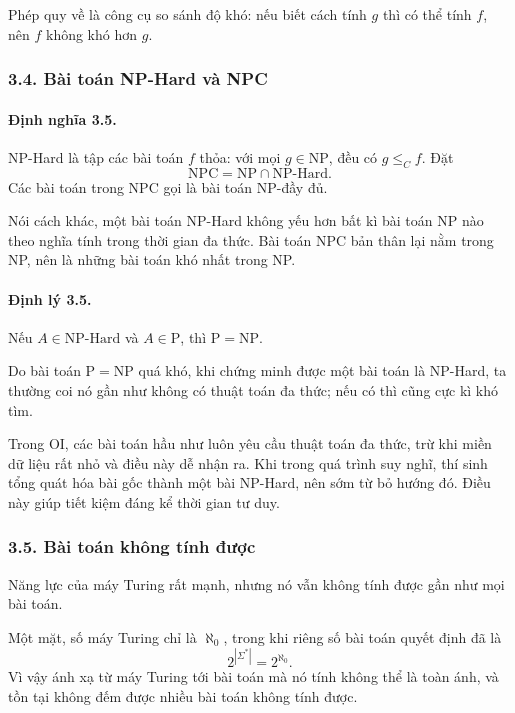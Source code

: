 \documentclass[11pt]{article}
\begin{document}
Phép quy về là công cụ so sánh độ khó: nếu biết cách tính \(g\) thì có thể tính
\(f\), nên \(f\) không khó hơn \(g\).

\subsubsection*{3.4. Bài toán NP-Hard và NPC}

\paragraph{Định nghĩa 3.5.}
NP-Hard là tập các bài toán \(f\) thỏa: với mọi \(g\in\mathrm{NP}\), đều có
\(g\le_C f\). Đặt
\[
  \mathrm{NPC}=\mathrm{NP}\cap\mathrm{NP\text{-}Hard}.
\]
Các bài toán trong NPC gọi là bài toán NP-đầy đủ.

Nói cách khác, một bài toán NP-Hard không yếu hơn bất kì bài toán NP nào theo
nghĩa tính trong thời gian đa thức. Bài toán NPC bản thân lại nằm trong NP, nên
là những bài toán khó nhất trong NP.

\paragraph{Định lý 3.5.}
Nếu \(A\in\mathrm{NP\text{-}Hard}\) và \(A\in\mathrm P\), thì
\(\mathrm P=\mathrm{NP}\).

Do bài toán \(\mathrm P=\mathrm{NP}\) quá khó, khi chứng minh được một bài toán
là NP-Hard, ta thường coi nó gần như không có thuật toán đa thức; nếu có thì
cũng cực kì khó tìm.

Trong OI, các bài toán hầu như luôn yêu cầu thuật toán đa thức, trừ khi miền dữ
liệu rất nhỏ và điều này dễ nhận ra. Khi trong quá trình suy nghĩ, thí sinh
tổng quát hóa bài gốc thành một bài NP-Hard, nên sớm từ bỏ hướng đó. Điều này
giúp tiết kiệm đáng kể thời gian tư duy.

\subsubsection*{3.5. Bài toán không tính được}

Năng lực của máy Turing rất mạnh, nhưng nó vẫn không tính được gần như mọi bài
toán.

Một mặt, số máy Turing chỉ là \(\aleph_0\), trong khi riêng số bài toán quyết
định đã là
\[
  2^{|\Sigma^*|}=2^{\aleph_0}.
\]
Vì vậy ánh xạ từ máy Turing tới bài toán mà nó tính không thể là toàn ánh, và
tồn tại không đếm được nhiều bài toán không tính được.
\end{document}
